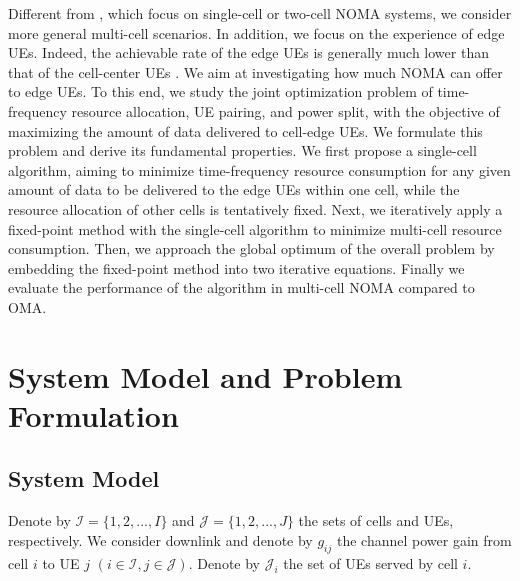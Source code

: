 \documentclass[10pt,journal,final,finalsubmission,twocolumn]{IEEEtran}
\begin{document}
Different from \cite{Do1, Do2, Guo, Pei}, which focus on single-cell or two-cell NOMA systems, we consider more general multi-cell scenarios. In addition, we focus on the experience of edge UEs. Indeed, the achievable rate of the edge UEs is generally much lower than that of the cell-center UEs \cite{Dai}. We aim at investigating how much NOMA can offer to edge UEs. To this end, we study the joint optimization problem of time-frequency resource allocation, UE pairing, and power split, with the objective of maximizing the amount of data delivered to cell-edge UEs. We formulate this problem and derive its fundamental properties. We first propose a single-cell algorithm, aiming to minimize time-frequency resource consumption for any given amount of data to be delivered to the edge UEs within one cell, while the resource allocation of other cells is tentatively fixed. Next, we iteratively apply a fixed-point method with the single-cell algorithm to minimize multi-cell resource consumption. Then, we approach the global optimum of the overall problem by embedding the fixed-point method into two iterative equations. Finally we evaluate the performance of the algorithm in multi-cell NOMA compared to OMA.

\section{System Model and Problem Formulation} \label{Sec:SystemModel}

\subsection{System Model}\label{Preliminaries}

Denote by $\mathcal{I} = \{1,2,...,I \}$ and $\mathcal{J} = \{1,2,...,J\}$ the sets of cells and UEs, respectively. 
We consider downlink and denote by $g_{ij}$ the channel power gain from cell $i$ to UE $j$ $(i \in \mathcal{I}, j \in \mathcal{J})$. Denote by $\mathcal{J}_i$ the set of UEs served by cell $i$.
\end{document}

